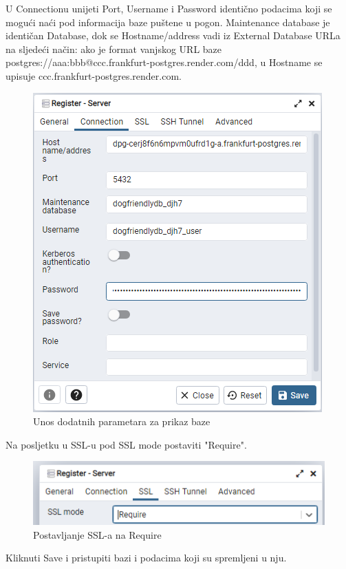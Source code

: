         U Connectionu unijeti Port, Username i Password identično podacima koji se mogući naći pod informacija baze puštene u pogon. Maintenance database je identičan Database, dok se Hostname/address vadi iz External Database URLa na sljedeći način:
        ako je format vanjskog URL baze postgres://aaa:bbb@ccc.frankfurt-postgres.render.com/ddd, u Hostname se upisuje ccc.frankfurt-postgres.render.com.
        \begin{figure}[H]
			    \includegraphics[width=\textwidth]{slike/baza3.png} 
			        \caption{Unos dodatnih parametara za prikaz baze}
			    \label{fig:Unos dodatnih parametara za prikaz baze}
		    \end{figure}
        Na posljetku u SSL-u pod SSL mode postaviti "Require".
        \begin{figure}[H]
			    \includegraphics[width=\textwidth]{slike/baza4.png} 
			        \caption{Postavljanje SSL-a na Require}
			    \label{fig:Postavljanje SSL-a na Require}
		    \end{figure}
        Kliknuti Save i pristupiti bazi i podacima koji su spremljeni u nju.

        
			\eject 